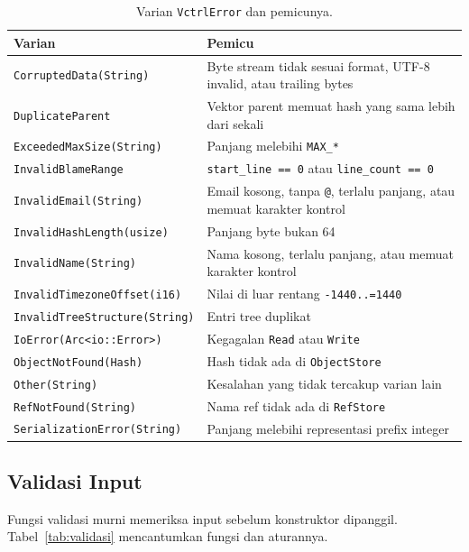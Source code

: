 \documentclass[11pt,a4paper]{article}
\begin{document}
\begin{table}[H]
	\centering
	\caption{Varian \texttt{VctrlError} dan pemicunya.}
	\label{tab:error}
	\footnotesize
	\begin{tabularx}{\textwidth}{l X}
		\toprule
		Varian & Pemicu \\
		\midrule
		\texttt{CorruptedData(String)} & Byte stream tidak sesuai format, UTF-8 invalid, atau trailing bytes \\
		\texttt{DuplicateParent} & Vektor parent memuat hash yang sama lebih dari sekali \\
		\texttt{ExceededMaxSize(String)} & Panjang melebihi \texttt{MAX\_*} \\
		\texttt{InvalidBlameRange} & \texttt{start\_line == 0} atau \texttt{line\_count == 0} \\
		\texttt{InvalidEmail(String)} & Email kosong, tanpa \texttt{@}, terlalu panjang, atau memuat karakter kontrol \\
		\texttt{InvalidHashLength(usize)} & Panjang byte bukan 64 \\
		\texttt{InvalidName(String)} & Nama kosong, terlalu panjang, atau memuat karakter kontrol \\
		\texttt{InvalidTimezoneOffset(i16)} & Nilai di luar rentang \texttt{-1440..=1440} \\
		\texttt{InvalidTreeStructure(String)} & Entri tree duplikat \\
		\texttt{IoError(Arc<io::Error>)} & Kegagalan \texttt{Read} atau \texttt{Write} \\
		\texttt{ObjectNotFound(Hash)} & Hash tidak ada di \texttt{ObjectStore} \\
		\texttt{Other(String)} & Kesalahan yang tidak tercakup varian lain \\
		\texttt{RefNotFound(String)} & Nama ref tidak ada di \texttt{RefStore} \\
		\texttt{SerializationError(String)} & Panjang melebihi representasi prefix integer \\
		\bottomrule
	\end{tabularx}
\end{table}

\subsection{Validasi Input}

Fungsi validasi murni memeriksa input sebelum konstruktor dipanggil. Tabel~\ref{tab:validasi} mencantumkan fungsi dan aturannya.
\end{document}
